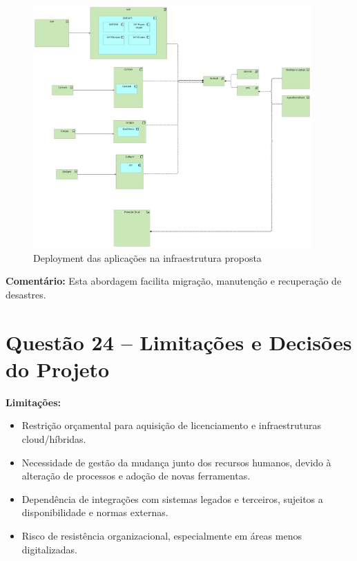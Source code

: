 \documentclass[12pt,a4paper,final]{article}
\begin{document}
    \begin{figure}[H]
        \centering
        \includegraphics[width=0.95\textwidth]{Q23 - Implementation and Deployment.jpg}
        \caption{Deployment das aplicações na infraestrutura proposta}
        \label{fig:q23-deployment}
    \end{figure}

    \textbf{Comentário:} Esta abordagem facilita migração, manutenção e recuperação de desastres.

    \section*{Questão 24 – Limitações e Decisões do Projeto}

    \textbf{Limitações:}
    \begin{itemize}
        \item Restrição orçamental para aquisição de licenciamento e infraestruturas cloud/híbridas.
        \item Necessidade de gestão da mudança junto dos recursos humanos, devido à alteração de processos e adoção de novas ferramentas.
        \item Dependência de integrações com sistemas legados e terceiros, sujeitos a disponibilidade e normas externas.
        \item Risco de resistência organizacional, especialmente em áreas menos digitalizadas.
    \end{itemize}
\end{document}
